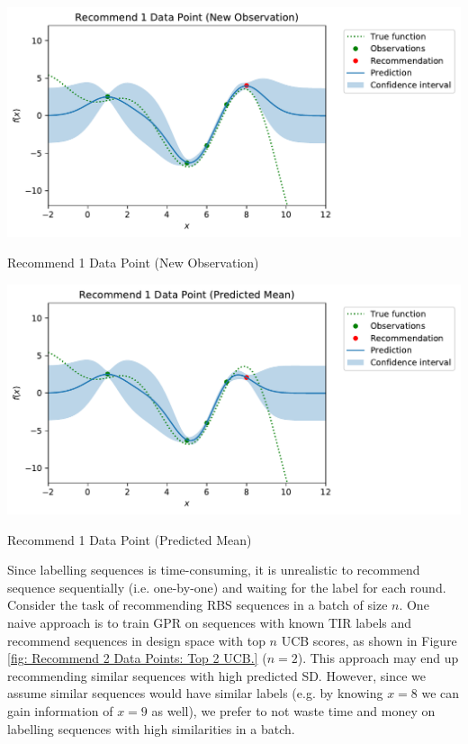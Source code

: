 \vspace{0.5cm}
\begin{minipage}{\textwidth}
  \begin{minipage}[b]{0.49\textwidth}
    \centering
    \includegraphics[scale=0.45]{plots/Recommend 1 Data Point (New Observation).pdf}
     \captionsetup{type=figure}
     \vspace{-0.5cm}
    \caption{Recommend 1 Data Point (New Observation)
    }
    \label{fig: Recommend 1 Data Point (New Observation)}
\end{minipage}
  \hfill
  \begin{minipage}[b]{0.49\textwidth}
    \centering
    \includegraphics[scale=0.45]{plots/Recommend 1 Data Point (Predicted Mean).pdf}
     \captionsetup{type=figure}
     \vspace{-0.5cm}
    \caption{Recommend 1 Data Point (Predicted Mean)
    }
    \label{fig: Recommend 1 Data Point (Predicted Mean)}
 \end{minipage}
 \end{minipage}
 \vspace{0.5cm}

Since labelling sequences is time-consuming, it is unrealistic to recommend sequence sequentially (i.e. one-by-one) and waiting for the label for each round.
Consider the task of recommending RBS sequences in a batch of size $n$. One naive approach is to train GPR on sequences with known TIR labels and recommend sequences in design space with top $n$ UCB scores, as shown in Figure \ref{fig: Recommend 2 Data Points: Top 2 UCB.} ($n = 2$).
This approach may end up recommending similar sequences with high predicted SD.
However, since we assume similar sequences would have similar labels (e.g. by knowing $x=8$ we can gain information of $x=9$ as well), we prefer to not waste time and money on labelling sequences with high similarities in a batch.

